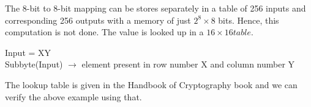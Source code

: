 \documentclass[11pt]{article}
\begin{document}
The 8-bit to 8-bit mapping can be stores separately in a table of 256 inputs and corresponding 256 outputs with a memory of just $2^8 \times 8$ bits. Hence, this computation is not done. The value is looked up in a $16 \times 16 table$.
\begin{center}
    Input = XY\\
    Subbyte(Input) $\rightarrow$ element present in row number X and column number Y
\end{center}
The lookup table is given in the Handbook of Cryptography book and we can verify the above example using that.
\end{document}
